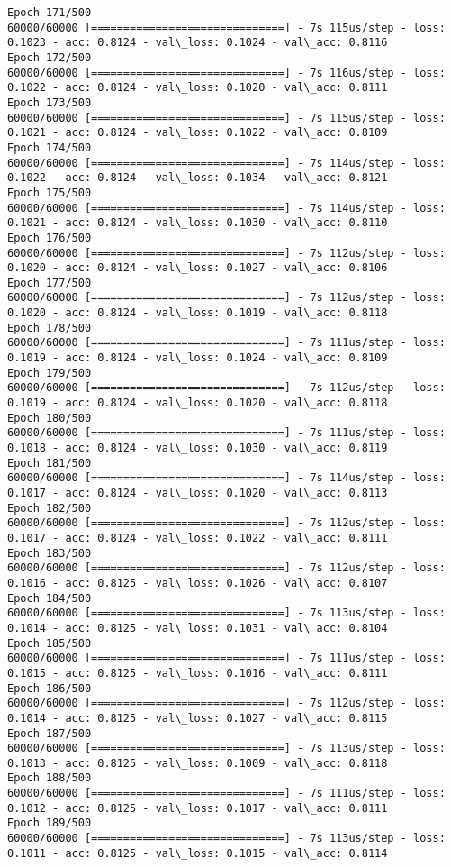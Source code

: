 \documentclass[11pt]{article}
\begin{document}
\begin{Verbatim}[commandchars=\\\{\}]
Epoch 171/500
60000/60000 [==============================] - 7s 115us/step - loss: 0.1023 - acc: 0.8124 - val\_loss: 0.1024 - val\_acc: 0.8116
Epoch 172/500
60000/60000 [==============================] - 7s 116us/step - loss: 0.1022 - acc: 0.8124 - val\_loss: 0.1020 - val\_acc: 0.8111
Epoch 173/500
60000/60000 [==============================] - 7s 115us/step - loss: 0.1021 - acc: 0.8124 - val\_loss: 0.1022 - val\_acc: 0.8109
Epoch 174/500
60000/60000 [==============================] - 7s 114us/step - loss: 0.1022 - acc: 0.8124 - val\_loss: 0.1034 - val\_acc: 0.8121
Epoch 175/500
60000/60000 [==============================] - 7s 114us/step - loss: 0.1021 - acc: 0.8124 - val\_loss: 0.1030 - val\_acc: 0.8110
Epoch 176/500
60000/60000 [==============================] - 7s 112us/step - loss: 0.1020 - acc: 0.8124 - val\_loss: 0.1027 - val\_acc: 0.8106
Epoch 177/500
60000/60000 [==============================] - 7s 112us/step - loss: 0.1020 - acc: 0.8124 - val\_loss: 0.1019 - val\_acc: 0.8118
Epoch 178/500
60000/60000 [==============================] - 7s 111us/step - loss: 0.1019 - acc: 0.8124 - val\_loss: 0.1024 - val\_acc: 0.8109
Epoch 179/500
60000/60000 [==============================] - 7s 112us/step - loss: 0.1019 - acc: 0.8124 - val\_loss: 0.1020 - val\_acc: 0.8118
Epoch 180/500
60000/60000 [==============================] - 7s 111us/step - loss: 0.1018 - acc: 0.8124 - val\_loss: 0.1030 - val\_acc: 0.8119
Epoch 181/500
60000/60000 [==============================] - 7s 114us/step - loss: 0.1017 - acc: 0.8124 - val\_loss: 0.1020 - val\_acc: 0.8113
Epoch 182/500
60000/60000 [==============================] - 7s 112us/step - loss: 0.1017 - acc: 0.8124 - val\_loss: 0.1022 - val\_acc: 0.8111
Epoch 183/500
60000/60000 [==============================] - 7s 112us/step - loss: 0.1016 - acc: 0.8125 - val\_loss: 0.1026 - val\_acc: 0.8107
Epoch 184/500
60000/60000 [==============================] - 7s 113us/step - loss: 0.1014 - acc: 0.8125 - val\_loss: 0.1031 - val\_acc: 0.8104
Epoch 185/500
60000/60000 [==============================] - 7s 111us/step - loss: 0.1015 - acc: 0.8125 - val\_loss: 0.1016 - val\_acc: 0.8111
Epoch 186/500
60000/60000 [==============================] - 7s 112us/step - loss: 0.1014 - acc: 0.8125 - val\_loss: 0.1027 - val\_acc: 0.8115
Epoch 187/500
60000/60000 [==============================] - 7s 113us/step - loss: 0.1013 - acc: 0.8125 - val\_loss: 0.1009 - val\_acc: 0.8118
Epoch 188/500
60000/60000 [==============================] - 7s 111us/step - loss: 0.1012 - acc: 0.8125 - val\_loss: 0.1017 - val\_acc: 0.8111
Epoch 189/500
60000/60000 [==============================] - 7s 113us/step - loss: 0.1011 - acc: 0.8125 - val\_loss: 0.1015 - val\_acc: 0.8114

\end{Verbatim}
\end{document}
